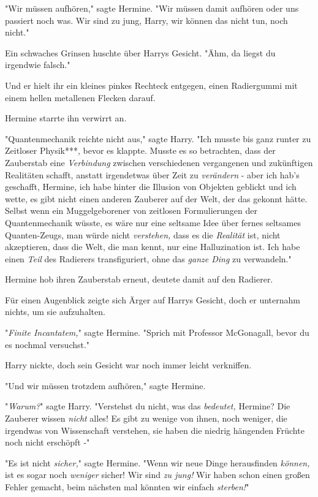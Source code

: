 {"Wir müssen aufhören," sagte Hermine. "Wir müssen damit aufhören oder uns passiert noch was. Wir sind zu jung, Harry, wir können das nicht tun, noch nicht."

Ein schwaches Grinsen huschte über Harrys Gesicht. "Ähm, da liegst du irgendwie falsch."

Und er hielt ihr ein kleines pinkes Rechteck entgegen, einen Radiergummi mit einem hellen metallenen Flecken darauf.

Hermine starrte ihn verwirrt an.

"Quantenmechanik reichte nicht aus," sagte Harry. "Ich musste bis ganz runter zu Zeitloser Physik***, bevor es klappte. Musste es so betrachten, dass der Zauberstab eine \emph{Verbindung} zwischen verschiedenen vergangenen und zukünftigen Realitäten schafft, anstatt irgendetwas über Zeit zu \emph{verändern} - aber ich hab's geschafft, Hermine, ich habe hinter die Illusion von Objekten geblickt und ich wette, es gibt nicht einen anderen Zauberer auf der Welt, der das gekonnt hätte. Selbst wenn ein Muggelgeborener von zeitlosen Formulierungen der Quantenmechanik wüsste, es wäre nur eine seltsame Idee über fernes seltsames Quanten-Zeugs, man würde nicht \emph{verstehen,} dass es die \emph{Realität} ist, nicht akzeptieren, dass die Welt, die man kennt, nur eine Halluzination ist. Ich habe einen \emph{Teil} des Radierers transfiguriert, ohne das \emph{ganze Ding} zu verwandeln."

Hermine hob ihren Zauberstab erneut, deutete damit auf den Radierer.

Für einen Augenblick zeigte sich Ärger auf Harrys Gesicht, doch er unternahm nichts, um sie aufzuhalten.

"\emph{Finite Incantatem,}" sagte Hermine. "Sprich mit Professor McGonagall, bevor du es nochmal versuchst."

Harry nickte, doch sein Gesicht war noch immer leicht verkniffen.

"Und wir müssen trotzdem aufhören," sagte Hermine.

"\emph{Warum?}" sagte Harry. "Verstehst du nicht, was das \emph{bedeutet,} Hermine? Die Zauberer wissen \emph{nicht} alles! Es gibt zu wenige von ihnen, noch weniger, die irgendwas von Wissenschaft verstehen, sie haben die niedrig hängenden Früchte noch nicht erschöpft -"

"Es ist nicht \emph{sicher,}" sagte Hermine. "Wenn wir neue Dinge herausfinden \emph{können,} ist es sogar noch \emph{weniger} sicher! Wir sind \emph{zu jung!} Wir haben schon einen großen Fehler gemacht, beim nächsten mal könnten wir einfach \emph{sterben!}"

}
